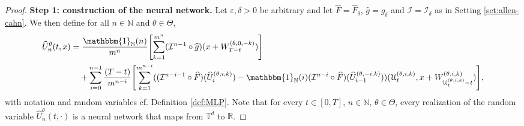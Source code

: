 \documentclass{article}
\numberwithin{equation}{section}
\newcommand{\T}{\mathbb{T}}
\newcommand{\R}{\mathbb{R}}
\newcommand{\N}{\mathbb{N}}
\newcommand{\cI}{\mathcal{I}}
\renewcommand{\epsilon}{\varepsilon}
\newcommand{\1}{\mathbbm{1}}
\DeclarePairedDelimiter{\br}{[}{]}
\DeclarePairedDelimiter{\pr}{(}{)}
\newcommand{\Fhat}{\widehat{F}}
\newcommand{\Uhat}{\widehat{U}}
\newcommand{\ghat}{\widehat{g}}
\begin{document}
\begin{proof}
\textbf{Step 1: construction of the neural network. }
Let $\epsilon,\delta>0$ be arbitrary and let $\Fhat = \Fhat_\delta$, $\ghat=\ghat_\delta$ and $\cI=\cI_\delta$ as in Setting \ref{set:allen-cahn}. We then define for all $n\in\N$ and $\theta\in\Theta$, 
\begin{equation}\label{eq:nn-mlp}
\begin{split}
\Uhat_n^\theta(t,x) 
& = \frac{\1_\N(n)}{m^n} \br[\Bigg]{ \sum_{k=1}^{m^n} (\cI^{n-1}\circ\ghat)\pr[\bigl]{x + W_{T-t}^{(\theta,0,-k)}} } \\
& \quad + \sum_{i=0}^{n-1} \frac{(T-t)}{m^{n-i}}\br[\Bigg]{ \sum_{k=1}^{m^{n-i}} \pr[]{ (\cI^{n-i-1}\circ\Fhat)(\Uhat_i^{(\theta,i,k)}) - \1_\N(i) (\cI^{n-i}\circ\Fhat)( \Uhat_{i-1}^{(\theta,-i,k)}) } \pr[]{ \EuScript{U}_t^{(\theta,i,k)}, x + W_{\EuScript{U}_t^{(\theta,i,k)}-t}^{(\theta,i,k)} } }, 
\end{split}
\end{equation}
with notation and random variables cf. Definition \ref{def:MLP}. Note that for every $t\in[0,T]$, $n\in\N$, $\theta\in\Theta$, every realization of the random variable $\Uhat_n^\theta(t,\cdot)$ is a neural network that maps from $\T^d$ to $\R$. 


\end{proof}
\end{document}
